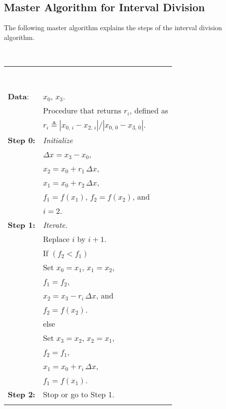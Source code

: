 
\subsection{Master Algorithm for Interval Division}
The following master algorithm explains the steps of 
the interval division algorithm.\\

\noindent
\begin{minipage}[b]{\textwidth}
\begin{algorithm}
~\\
{\em
\begin{tabularx}{\headwidth}{m{2cm}l}
\multicolumn{2}{l}{\hspace{\textwidth}~} \\ \\[-8ex]\\
\hline \\[-2ex]
 \textbf{Data}: 
 & $x_0$, $x_3$. \\
 & Procedure that returns $r_i$, defined as\\
 & $r_i \triangleq |x_{0, \, i} - x_{2, \, i} | / |x_{0, \, 0} - x_{3, \, 0}|$. \\
\textbf{Step 0:} 
 & {\it Initialize }\\
  & $\Delta x = x_3 - x_0$,\\
  &$ x_2 = x_0 + r_1 \, \Delta x$,\\
  & $x_1 = x_0 + r_2 \, \Delta x$,\\
  & $f_1 = f(x_1)$, $ f_2 = f(x_2)$, and\\
  & $i = 2$.\\
\textbf{Step 1:} & {\it Iterate.}\\
  & Replace $i$ by $i + 1$.\\
  & If  $(f_2 < f_1)$\\
    &  \hspace{1cm}  Set  $x_0 = x_1$, $x_1 = x_2$,\\
    &   \hspace{1cm}   $f_1 = f_2$,\\
    &   \hspace{1cm}   $x_2 = x_3 - r_i \, \Delta x$, and\\
    &    \hspace{1cm}  $f_2 = f(x_2)$.\\
   & else\\
   &    \hspace{1cm} Set $x_3 = x_2$, $x_2 = x_1$,\\
   &    \hspace{1cm}  $f_2 = f_1$,\\
   &    \hspace{1cm}  $x_1 = x_0 + r_i \,  \Delta x$,\\
   &    \hspace{1cm}  $f_1 = f(x_1)$.\\
   \textbf{Step 2:} & Stop or go to Step 1.\\
   \hline \\
\end{tabularx}
}
\end{algorithm}
\end{minipage}
